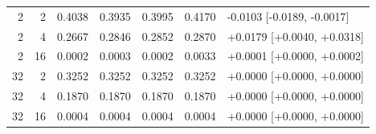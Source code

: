 \begin{table}[htbp]
\begin{tabular}{rrrrrrl}
2 & 2 & 0.4038 & 0.3935 & 0.3995 & 0.4170 & -0.0103 [-0.0189, -0.0017]\\
2 & 4 & 0.2667 & 0.2846 & 0.2852 & 0.2870 & +0.0179 [+0.0040, +0.0318]\\
2 & 16 & 0.0002 & 0.0003 & 0.0002 & 0.0033 & +0.0001 [+0.0000, +0.0002]\\
32 & 2 & 0.3252 & 0.3252 & 0.3252 & 0.3252 & +0.0000 [+0.0000, +0.0000]\\
32 & 4 & 0.1870 & 0.1870 & 0.1870 & 0.1870 & +0.0000 [+0.0000, +0.0000]\\
32 & 16 & 0.0004 & 0.0004 & 0.0004 & 0.0004 & +0.0000 [+0.0000, +0.0000]\\
\bottomrule
\end{tabular}
\end{table}

